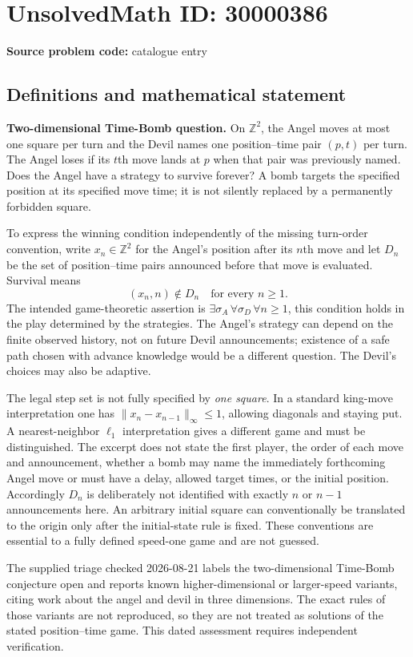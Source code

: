\documentclass[11pt]{article}
\newcommand{\Z}{\mathbb{Z}}
\begin{document}
\section*{UnsolvedMath ID: 30000386}
\textbf{Source problem code:} catalogue entry
\subsection{Definitions and mathematical statement}
\textbf{Two-dimensional Time-Bomb question.} On \(\Z^2\), the Angel moves at most one square per turn and the Devil names one position--time pair \((p,t)\) per turn. The Angel loses if its \(t\)th move lands at \(p\) when that pair was previously named. Does the Angel have a strategy to survive forever? A bomb targets the specified position at its specified move time; it is not silently replaced by a permanently forbidden square.\par To express the winning condition independently of the missing turn-order convention, write \(x_n\in\Z^2\) for the Angel's position after its \(n\)th move and let \(D_n\) be the set of position--time pairs announced before that move is evaluated. Survival means\[(x_n,n)\notin D_n\quad\text{for every }n\ge1.\] The intended game-theoretic assertion is \(\exists\sigma_A\,\forall\sigma_D\,\forall n\ge1\), this condition holds in the play determined by the strategies. The Angel's strategy can depend on the finite observed history, not on future Devil announcements; existence of a safe path chosen with advance knowledge would be a different question. The Devil's choices may also be adaptive.\par The legal step set is not fully specified by \emph{one square}. In a standard king-move interpretation one has \(\|x_n-x_{n-1}\|_\infty\le1\), allowing diagonals and staying put. A nearest-neighbor \(\ell_1\) interpretation gives a different game and must be distinguished. The excerpt does not state the first player, the order of each move and announcement, whether a bomb may name the immediately forthcoming Angel move or must have a delay, allowed target times, or the initial position. Accordingly \(D_n\) is deliberately not identified with exactly \(n\) or \(n-1\) announcements here. An arbitrary initial square can conventionally be translated to the origin only after the initial-state rule is fixed. These conventions are essential to a fully defined speed-one game and are not guessed.\par The supplied triage checked 2026-08-21 labels the two-dimensional Time-Bomb conjecture open and reports known higher-dimensional or larger-speed variants, citing work about the angel and devil in three dimensions. The exact rules of those variants are not reproduced, so they are not treated as solutions of the stated position--time game. This dated assessment requires independent verification.
\end{document}
